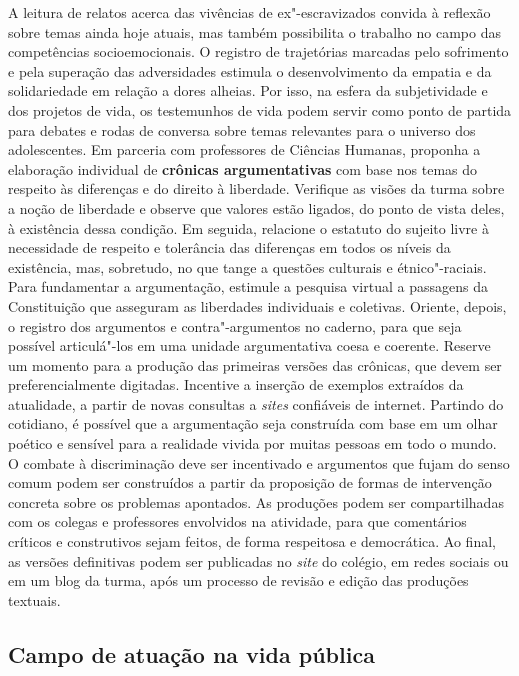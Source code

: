 \documentclass[12pt]{extarticle}
\begin{document}
A leitura de relatos acerca das vivências de ex"-escravizados
  convida à reflexão sobre temas ainda hoje
  atuais, mas também possibilita o trabalho no campo das competências
  socioemocionais. O registro de trajetórias marcadas pelo sofrimento e
  pela superação das adversidades estimula o desenvolvimento da empatia
  e da solidariedade em relação a dores alheias. Por isso, na esfera da
  subjetividade e dos projetos de vida, os testemunhos de vida podem
  servir como ponto de partida para debates e rodas de conversa sobre
  temas relevantes para o universo dos adolescentes. Em parceria com
  professores de Ciências Humanas, proponha a elaboração individual de
  \textbf{crônicas argumentativas} com base nos temas do respeito às
  diferenças e do direito à liberdade. Verifique as visões da turma
  sobre a noção de liberdade e observe que valores estão ligados, do
  ponto de vista deles, à existência dessa condição. Em seguida,
  relacione o estatuto do sujeito livre à necessidade de respeito e
  tolerância das diferenças em todos os níveis da existência, mas,
  sobretudo, no que tange a questões culturais e étnico"-raciais. Para
  fundamentar a argumentação, estimule a pesquisa virtual a passagens da
  Constituição que asseguram as liberdades individuais e coletivas.
  Oriente, depois, o registro dos argumentos e contra"-argumentos no
  caderno, para que seja possível articulá"-los em uma unidade
  argumentativa coesa e coerente. Reserve um momento para a produção das
  primeiras versões das crônicas, que devem ser preferencialmente
  digitadas. Incentive a inserção de exemplos extraídos da atualidade, a
  partir de novas consultas a \emph{sites} confiáveis de internet.
  Partindo do cotidiano, é possível que a argumentação seja construída
  com base em um olhar poético e sensível para a realidade vivida por
  muitas pessoas em todo o mundo. O combate à discriminação deve ser
  incentivado e argumentos que fujam do senso comum podem ser
  construídos a partir da proposição de formas de intervenção concreta
  sobre os problemas apontados. As produções podem ser compartilhadas
  com os colegas e professores envolvidos na atividade, para que
  comentários críticos e construtivos sejam feitos, de forma respeitosa
  e democrática. Ao final, as versões definitivas podem ser publicadas
  no \emph{site} do colégio, em redes sociais ou em um blog da turma,
  após um processo de revisão e edição das produções textuais.

  \subsection{Campo de atuação na vida pública}
\end{document}
